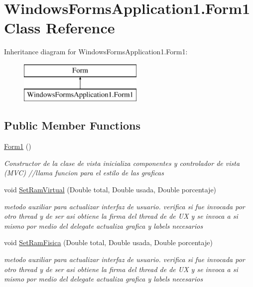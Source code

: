 \hypertarget{class_windows_forms_application1_1_1_form1}{}\section{Windows\+Forms\+Application1.\+Form1 Class Reference}
\label{class_windows_forms_application1_1_1_form1}
Inheritance diagram for Windows\+Forms\+Application1.\+Form1\+:\begin{figure}[H]
\begin{center}
\leavevmode
\includegraphics[height=2.000000cm]{class_windows_forms_application1_1_1_form1}
\end{center}
\end{figure}
\subsection*{Public Member Functions}
\begin{DoxyCompactItemize}
\item 
\hyperlink{class_windows_forms_application1_1_1_form1_a69c9068cd58521646d5e961a8b88a020}{Form1} ()
\begin{DoxyCompactList}\small\item\em Constructor de la clase de vista inicializa componentes y controlador de vista (M\+V\+C) //llama funcion para el estilo de las graficas \end{DoxyCompactList}\item 
void \hyperlink{class_windows_forms_application1_1_1_form1_a4fda0d42358d44b8d3912a8e4d20e914}{Set\+Ram\+Virtual} (Double total, Double usada, Double porcentaje)
\begin{DoxyCompactList}\small\item\em metodo auxiliar para actualizar interfaz de usuario. verifica si fue invocada por otro thread y de ser asi obtiene la firma del thread de de U\+X y se invoca a si mismo por medio del delegate actualiza grafica y labels necesarios \end{DoxyCompactList}\item 
void \hyperlink{class_windows_forms_application1_1_1_form1_afac9f5fe44220f30b2e8ec3750abd874}{Set\+Ram\+Fisica} (Double total, Double usada, Double porcentaje)
\begin{DoxyCompactList}\small\item\em metodo auxiliar para actualizar interfaz de usuario. verifica si fue invocada por otro thread y de ser asi obtiene la firma del thread de de U\+X y se invoca a si mismo por medio del delegate actualiza grafica y labels necesarios \end{DoxyCompactList}\end{DoxyCompactItemize}
